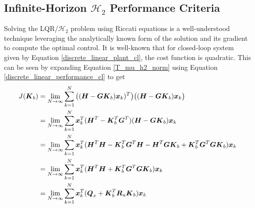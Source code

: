 \subsection{Infinite-Horizon $\mathcal{H}_{2}$ Performance Criteria}
Solving the LQR/$\mathcal{H}_{2}$ problem using Riccati equations is a well-understood technique leveraging the analytically known form of the solution and its gradient to compute the optimal control.  It is well-known that for closed-loop system given by Equation \eqref{discrete_linear_plant_cl}, the cost function is quadratic.  This can be seen by expanding Equation \eqref{T_mu_h2_norm} using Equation \eqref{discrete_linear_performance_cl} to get
\begin{equation}
\label{J_K_h2_cost}
\begin{aligned}
	J(\vb*{K}_{b}) &= \lim_{N \to \infty} \sum_{k = 1}^{N} \big{(}(\vb*{H} - \vb*{G}\vb*{K}_{b})\vb*{x}_{k})^{T} \big{)}
		\big{(}(\vb*{H} - \vb*{G}\vb*{K}_{b})\vb*{x}_{k}\big{)}\\
	&= \lim_{N \to \infty} \sum_{k = 1}^{N} \vb*{x}_{k}^{T}(\vb*{H}^{T} - \vb*{K}_{b}^{T}\vb*{G}^{T})(\vb*{H} - \vb*{G}\vb*{K}_{b})\vb*{x}_{k}\\
	&= \lim_{N \to \infty} \sum_{k = 1}^{N} \vb*{x}_{k}^{T}(\vb*{H}^{T}\vb*{H}
		- \vb*{K}_{b}^{T}\vb*{G}^{T}\vb*{H} - \vb*{H}^{T}\vb*{G}\vb*{K}_{b}
		+ \vb*{K}_{b}^{T}\vb*{G}^{T}\vb*{G}\vb*{K}_{b})\vb*{x}_{k}\\
	&= \lim_{N \to \infty} \sum_{k = 1}^{N} \vb*{x}_{k}^{T}(\vb*{H}^{T}\vb*{H}
		+ \vb*{K}_{b}^{T}\vb*{G}^{T}\vb*{G}\vb*{K}_{b})\vb*{x}_{k}\\
	&= \lim_{N \to \infty} \sum_{k = 1}^{N} \vb*{x}_{k}^{T}(\vb*{Q}_{x}
		+ \vb*{K}_{b}^{T}\vb*{R}_{u}\vb*{K}_{b})\vb*{x}_{k}\\
\end{aligned}
\end{equation}

